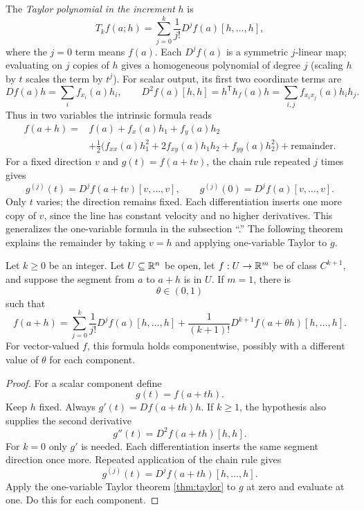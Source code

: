 The \emph{Taylor polynomial in the increment} $h$ is
\[
T_kf(a;h)=\sum_{j=0}^k\frac1{j!}D^jf(a)[h,\ldots,h],
\]
where the $j=0$ term means $f(a)$. Each $D^jf(a)$ is a symmetric
$j$-linear map; evaluating on $j$ copies of $h$ gives a homogeneous
polynomial of degree $j$ (scaling $h$ by $t$ scales the term by $t^j$).
For scalar output, its first two coordinate terms are
\[
Df(a)h=\sum_i f_{x_i}(a)h_i,\qquad
D^2f(a)[h,h]=h^{\mathsf T}h_f(a)h=\sum_{i,j}f_{x_ix_j}(a)h_ih_j.
\]
Thus in two variables the intrinsic formula reads
\[
\begin{split}
f(a+h)={}&f(a)+f_x(a)h_1+f_y(a)h_2\\
&+\tfrac12\bigl(f_{xx}(a)h_1^2+2f_{xy}(a)h_1h_2+f_{yy}(a)h_2^2\bigr)
+\text{remainder}.
\end{split}
\]
For a fixed direction $v$ and $g(t)=f(a+tv)$, the chain rule repeated
$j$ times gives
\[
g^{(j)}(t)=D^jf(a+tv)[v,\ldots,v],\qquad
g^{(j)}(0)=D^jf(a)[v,\ldots,v].
\]
Only $t$ varies; the direction remains fixed. Each differentiation inserts
one more copy of $v$, since the line has constant velocity and no higher
derivatives. This generalizes the one-variable formula in
the subsection ``.'' The following theorem explains
the remainder by taking $v=h$ and applying one-variable Taylor to $g$.


\begin{theorem}
\label{thm:multivariable-taylor}
Let $k\geq0$ be an integer. Let $U\subseteq\mathbb{R}^n$ be open, let $f:U\to\mathbb{R}^m$ be of class $C^{k+1}$, and suppose the segment from $a$ to $a+h$ is in $U$.  If $m=1$, there is
\[
\theta\in(0,1)
\]
such that
\[
f(a+h)
=
\sum_{j=0}^{k}\frac1{j!}D^jf(a)[h,\ldots,h]
+
\frac1{(k+1)!}D^{k+1}f(a+\theta h)[h,\ldots,h].
\]
For vector-valued $f$, this formula holds componentwise, possibly with a
different value of $\theta$ for each component.
\end{theorem}
\begin{proof}
For a scalar component define
\[
g(t)=f(a+th).
\]
Keep $h$ fixed. Always $g'(t)=Df(a+th)h$. If $k\geq1$, the
hypothesis also supplies the second derivative
\[
g''(t)=D^2f(a+th)[h,h].
\]
For $k=0$ only $g'$ is needed.
Each differentiation inserts the same segment direction once more.
Repeated application of the chain rule gives
\[
g^{(j)}(t)=D^jf(a+th)[h,\ldots,h].
\]
Apply the one-variable Taylor theorem \cref{thm:taylor} to $g$ at zero and
evaluate at one.  Do this for each component.
\end{proof}

